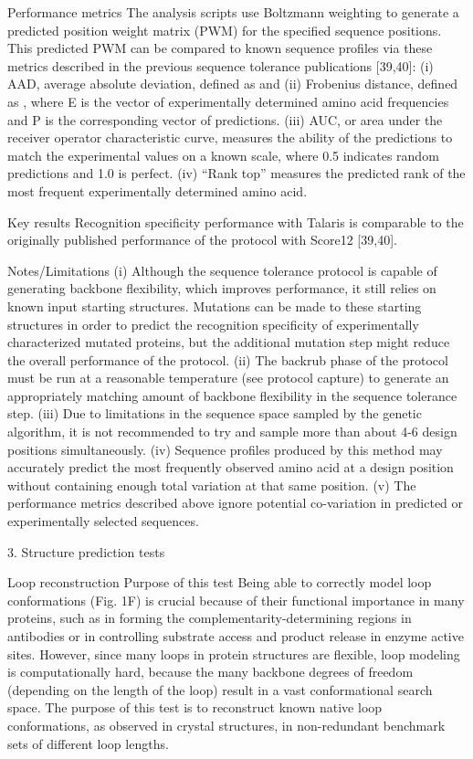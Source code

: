 Performance metrics
The analysis scripts use Boltzmann weighting to generate a predicted position weight matrix (PWM) for the specified sequence positions. This predicted PWM can be compared to known sequence profiles via these metrics described in the previous sequence tolerance publications [39,40]: (i) AAD, average absolute deviation, defined as  and (ii) Frobenius distance, defined as , where E is the vector of experimentally determined amino acid frequencies and P is the corresponding vector of predictions. (iii) AUC, or area under the receiver operator characteristic curve, measures the ability of the predictions to match the experimental values on a known scale, where 0.5 indicates random predictions and 1.0 is perfect. (iv) “Rank top” measures the predicted rank of the most frequent experimentally determined amino acid.

Key results
Recognition specificity performance with Talaris is comparable to the originally published performance of the protocol with Score12 [39,40].

Notes/Limitations
(i) Although the sequence tolerance protocol is capable of generating backbone flexibility, which improves performance, it still relies on known input starting structures. Mutations can be made to these starting structures in order to predict the recognition specificity of experimentally characterized mutated proteins, but the additional mutation step might reduce the overall performance of the protocol. (ii) The backrub phase of the protocol must be run at a reasonable temperature (see protocol capture) to generate an appropriately matching amount of backbone flexibility in the sequence tolerance step. (iii) Due to limitations in the sequence space sampled by the genetic algorithm, it is not recommended to try and sample more than about 4-6 design positions simultaneously. (iv) Sequence profiles produced by this method may accurately predict the most frequently observed amino acid at a design position without containing enough total variation at that same position. (v) The performance metrics described above ignore potential co-variation in predicted or experimentally selected sequences.

3. Structure prediction tests

Loop reconstruction
Purpose of this test
Being able to correctly model loop conformations (Fig. 1F) is crucial because of their functional importance in many proteins, such as in forming the complementarity-determining regions in antibodies or in controlling substrate access and product release in enzyme active sites. However, since many loops in protein structures are flexible, loop modeling is computationally hard, because the many backbone degrees of freedom (depending on the length of the loop) result in a vast conformational search space. The purpose of this test is to reconstruct known native loop conformations, as observed in crystal structures, in non-redundant benchmark sets of different loop lengths.

